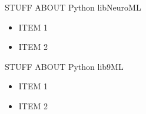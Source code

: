 \begin{multicols}{3}
STUFF ABOUT Python libNeuroML

\begin{itemize}[nolistsep,topsep=0em,leftmargin=1pc]
\item ITEM 1
\item ITEM 2
\end{itemize}


STUFF ABOUT Python lib9ML

\begin{itemize}[nolistsep,topsep=0em,leftmargin=1pc]
\item ITEM 1
\item ITEM 2
\end{itemize}

\end{multicols}


